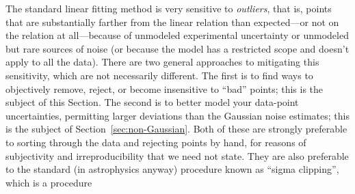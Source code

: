 \documentclass[12pt,twoside,pdftex]{article}
\newcommand{\sectionname}{Section}
\begin{document}
The standard linear fitting method is very sensitive to
\emph{outliers}, that is, points that are substantially farther from
the linear relation than expected---or not on the relation at
all---because of unmodeled experimental uncertainty or unmodeled but
rare sources of noise (or because the model has a restricted scope and
doesn't apply to all the data).  There are two general approaches to
mitigating this sensitivity, which are not necessarily different.  The
first is to find ways to objectively remove, reject, or become
insensitive to ``bad'' points; this is the subject of
this \sectionname.  The second is to better model your data-point
uncertainties, permitting larger deviations than the Gaussian noise
estimates; this is the subject of
\sectionname~\ref{sec:non-Gaussian}.  Both of these are strongly
preferable to sorting through the data and rejecting points by hand,
for reasons of subjectivity and irreproducibility that we need not
state.  They are also preferable to the standard (in astrophysics
anyway) procedure known as ``sigma clipping'', which is a procedure
\end{document}
